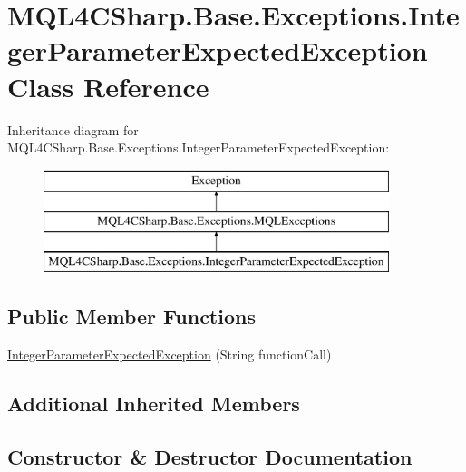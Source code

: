 \hypertarget{class_m_q_l4_c_sharp_1_1_base_1_1_exceptions_1_1_integer_parameter_expected_exception}{}\section{M\+Q\+L4\+C\+Sharp.\+Base.\+Exceptions.\+Integer\+Parameter\+Expected\+Exception Class Reference}
\label{class_m_q_l4_c_sharp_1_1_base_1_1_exceptions_1_1_integer_parameter_expected_exception}
Inheritance diagram for M\+Q\+L4\+C\+Sharp.\+Base.\+Exceptions.\+Integer\+Parameter\+Expected\+Exception\+:\begin{figure}[H]
\begin{center}
\leavevmode
\includegraphics[height=3.000000cm]{class_m_q_l4_c_sharp_1_1_base_1_1_exceptions_1_1_integer_parameter_expected_exception}
\end{center}
\end{figure}
\subsection*{Public Member Functions}
\begin{DoxyCompactItemize}
\item 
\hyperlink{class_m_q_l4_c_sharp_1_1_base_1_1_exceptions_1_1_integer_parameter_expected_exception_a2e924683b6de296dadab0c60684a23ac}{Integer\+Parameter\+Expected\+Exception} (String function\+Call)
\end{DoxyCompactItemize}
\subsection*{Additional Inherited Members}


\subsection{Constructor \& Destructor Documentation}
